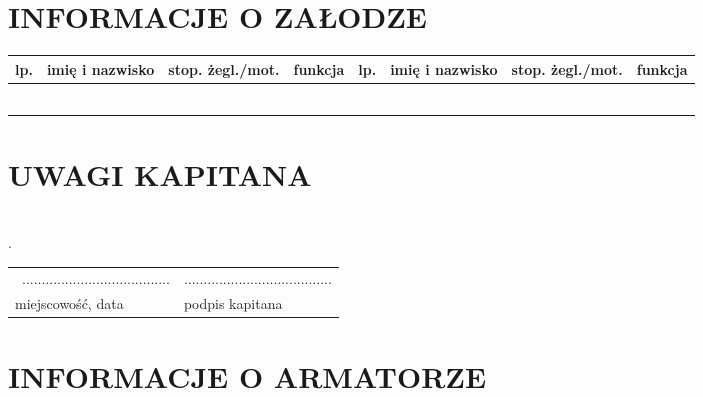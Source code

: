 \documentclass{article}
\begin{document}
\section*{INFORMACJE O ZAŁODZE}
    \begin{tabular}{|m{}|m{}|m{}|m{}||m{}|m{}|m{}|m{}|}
    \hline
    lp. & imię i nazwisko & stop. żegl./mot. & funkcja & lp. & imię i nazwisko &stop. żegl./mot. & funkcja\\
    \hline
    
&&&&&&&\\
\hline
&&&&&&&\\
\hline
&&&&&&&\\
\hline
&&&&&&&\\
\hline
&&&&&&&\\
\hline
&&&&&&&\\
\hline

    \end{tabular}
    
    
\section*{UWAGI KAPITANA}


\textit{}\dotfill \\
.\dotfill \\
\begin{tabularx}{\textwidth}{X X}
\\\
...................................... & ......................................\\
miejscowość, data & podpis kapitana\\
\end{tabularx}
\section*{INFORMACJE O ARMATORZE}
\end{document}
